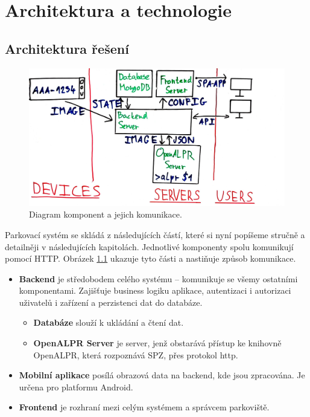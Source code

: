
\chapter{Architektura a technologie} \label{archtech}

\section{Architektura řešení} \label{architektura_reseni}

\begin{figure} \centering
  \includegraphics[width=145mm]{../img/architecture_drawing.jpg}
  \caption{Diagram komponent a jejich komunikace.}
  \label{fig:architecture_drawing}
\end{figure}

Parkovací systém se skládá z následujících částí, které si nyní popíšeme stručně a detailněji v
následujících kapitolách.
Jednotlivé komponenty spolu komunikují pomocí HTTP.
Obrázek \ref{fig:architecture_drawing} ukazuje tyto části a nastiňuje způsob komunikace.

\begin{itemize}
  \item \textbf{Backend} je středobodem celého systému -- komunikuje se všemy ostatními komponentami.
        Zajišťuje business logiku aplikace, autentizaci i autorizaci uživatelů i zařízení
        a perzistenci dat do databáze.
  \begin{itemize}
    \item \textbf{Databáze} slouží k ukládání a čtení dat.
    \item \textbf{OpenALPR Server} je server, jenž obstarává přístup
          ke knihovně OpenALPR, která rozpoznává SPZ, přes protokol http.
  \end{itemize}
  \item \textbf{Mobilní aplikace} posílá obrazová data na backend, kde jsou zpracována. Je určena pro platformu Android.
  \item \textbf{Frontend} je rozhraní mezi celým systémem a správcem parkoviště.
\end{itemize}

